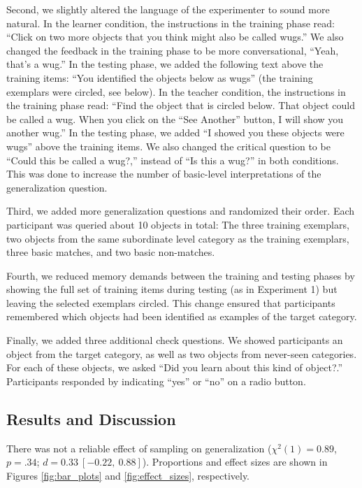 \documentclass[man]{apa2}
\begin{document}
Second, we slightly altered the language of the experimenter to sound more natural. In the learner condition, the instructions in the training phase read: ``Click on two more objects that you think might also be called wugs.'' We also changed the feedback in the training phase to be more conversational, ``Yeah, that's a wug.'' In the testing phase, we added the following text above the training items: ``You identified the objects below as wugs'' (the training exemplars were circled, see below). In the teacher condition, the instructions in the training phase read: ``Find the object that is circled below. That object could be called a wug. When you click on the ``See Another'' button, I will show you another wug.'' In the testing phase, we added ``I showed you these objects were wugs'' above the training items. We also changed the critical question to be ``Could this be called a wug?,'' instead of ``Is this a wug?'' in both conditions. This was done to increase the number of basic-level interpretations of the generalization question. 

Third, we added more generalization questions and randomized their order. Each participant was queried about 10 objects in total: The three training exemplars, two objects from the same subordinate level category as the training exemplars, three basic matches, and two basic non-matches. 

Fourth, we reduced memory demands between the training and testing phases by showing the full set of training items during testing (as in Experiment 1) but leaving the selected exemplars circled. This change ensured that participants remembered which objects had been identified as examples of the target category. 

Finally, we added three additional check questions. We showed participants an object from the target category, as well as two objects from never-seen categories. For each of these objects, we asked ``Did you learn about this kind of object?.'' Participants responded by indicating ``yes'' or ``no'' on a radio button.

\subsection{Results and Discussion}

There was not a reliable effect of sampling on generalization ($\chi^2(1) = 0.89$, $p = .34$; $d = 0.33\ [-0.22,\ 0.88]$). Proportions and effect sizes are shown in Figures \ref{fig:bar_plots} and \ref{fig:effect_sizes}, respectively.
\end{document}
